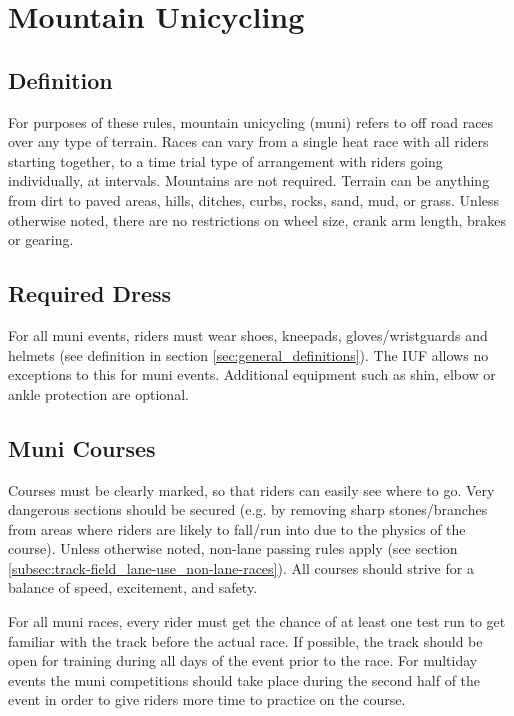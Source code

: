 \chapter*{Mountain Unicycling \label{chap:muni}}

\section{Definition}
For purposes of these rules, mountain unicycling (muni) refers to off road races over any type of terrain.
Races can vary from a single heat race with all riders starting together, to a time trial type of arrangement with riders going individually, at intervals.
Mountains are not required.
Terrain can be anything from dirt to paved areas, hills, ditches, curbs, rocks, sand, mud, or grass.
Unless otherwise noted, there are no restrictions on wheel size, crank arm length, brakes or gearing.

\section{Required Dress}
For all muni events, riders must wear shoes, kneepads, gloves/wristguards and helmets (see definition in section \ref{sec:general_definitions}).
The IUF allows no exceptions to this for muni events.
Additional equipment such as shin, elbow or ankle protection are optional.

\section{Muni Courses}
Courses must be clearly marked, so that riders can easily see where to go.
Very dangerous sections should be secured (e.g. by removing sharp stones/branches from areas where riders are likely to fall/run into due to the physics of the course).
Unless otherwise noted, non-lane passing rules apply (see section \ref{subsec:track-field_lane-use_non-lane-races}).
All courses should strive for a balance of speed, excitement, and safety.

For all muni races, every rider must get the chance of at least one test run to get familiar with the track before the actual race.
If possible, the track should be open for training during all days of the event prior to the race.
For multiday events the muni competitions should take place during the second half of the event in order to give riders more time to practice on the course.

